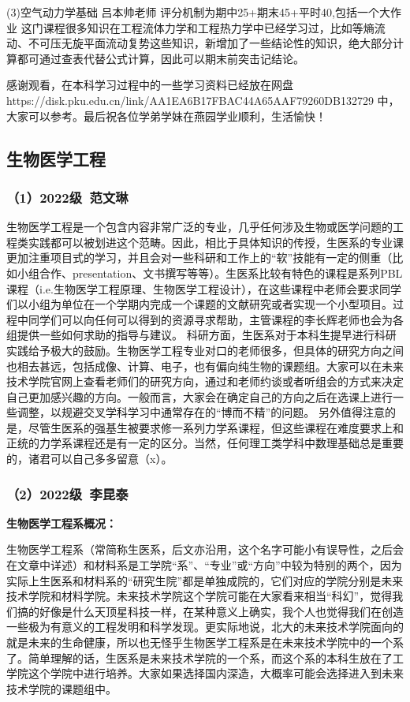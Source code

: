 \documentclass[11pt,oneside]{book}
\begin{document}
(3)空气动力学基础 吕本帅老师
评分机制为期中25+期末45+平时40,包括一个大作业
这门课程很多知识在工程流体力学和工程热力学中已经学习过，比如等熵流动、不可压无旋平面流动复势这些知识，新增加了一些结论性的知识，绝大部分计算都可通过查表代替公式计算，因此可以期末前突击记结论。

感谢观看，在本科学习过程中的一些学习资料已经放在网盘
https://disk.pku.edu.cn/link/AA1EA6B17FBAC44A65AAF79260DB132729
中，大家可以参考。最后祝各位学弟学妹在燕园学业顺利，生活愉快！

\subsection{生物医学工程}
\subsubsection{（1）2022级\ 范文琳}
生物医学工程是一个包含内容非常广泛的专业，几乎任何涉及生物或医学问题的工程类实践都可以被划进这个范畴。因此，相比于具体知识的传授，生医系的专业课更加注重项目式的学习，并且会对一些科研和工作上的“软”技能有一定的侧重（比如小组合作、presentation、文书撰写等等）。生医系比较有特色的课程是系列PBL课程（i.e.生物医学工程原理、生物医学工程设计），在这些课程中老师会要求同学们以小组为单位在一个学期内完成一个课题的文献研究或者实现一个小型项目。过程中同学们可以向任何可以得到的资源寻求帮助，主管课程的李长辉老师也会为各组提供一些如何求助的指导与建议。
科研方面，生医系对于本科生提早进行科研实践给予极大的鼓励。生物医学工程专业对口的老师很多，但具体的研究方向之间也相去甚远，包括成像、计算、电子，也有偏向纯生物的课题组。大家可以在未来技术学院官网上查看老师们的研究方向，通过和老师约谈或者听组会的方式来决定自己更加感兴趣的方向。一般而言，大家会在确定自己的方向之后在选课上进行一些调整，以规避交叉学科学习中通常存在的“博而不精”的问题。
另外值得注意的是，尽管生医系的强基生被要求修一系列力学系课程，但这些课程在难度要求上和正统的力学系课程还是有一定的区分。当然，任何理工类学科中数理基础总是重要的，诸君可以自己多多留意（x）。

\subsubsection{（2）2022级\ 李昆泰}
\textbf{生物医学工程系概况：}

生物医学工程系（常简称生医系，后文亦沿用，这个名字可能小有误导性，之后会在文章中详述）和材料系是工学院“系”、“专业”或“方向”中较为特别的两个，因为实际上生医系和材料系的“研究生院”都是单独成院的，它们对应的学院分别是未来技术学院和材料学院。未来技术学院这个学院可能在大家看来相当“科幻”，觉得我们搞的好像是什么天顶星科技一样，在某种意义上确实，我个人也觉得我们在创造一些极为有意义的工程发明和科学发现。更实际地说，北大的未来技术学院面向的就是未来的生命健康，所以也无怪乎生物医学工程系是在未来技术学院中的一个系了。简单理解的话，生医系是未来技术学院的一个系，而这个系的本科生放在了工学院这个学院中进行培养。大家如果选择国内深造，大概率可能会选择进入到未来技术学院的课题组中。
\end{document}
